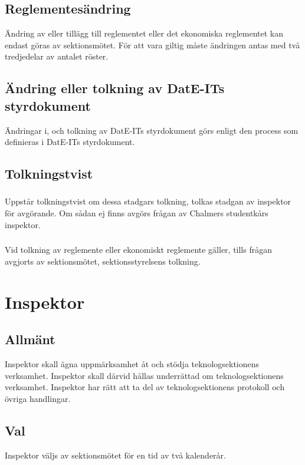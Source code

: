 \documentclass[a4paper]{dtek}
\begin{document}
\subsection{Reglementesändring}
Ändring av eller tillägg till reglementet eller det ekonomiska reglementet kan endast göras av sektionsmötet. För att vara giltig måste ändringen antas med två tredjedelar av antalet röster.
\subsection{Ändring eller tolkning av DatE-ITs styrdokument}
Ändringar i, och tolkning av DatE-ITs styrdokument görs enligt den process som definieras i DatE-ITs styrdokument.
\subsection{Tolkningstvist}
\subsubsection{}
Uppstår tolkningstvist om dessa stadgars tolkning, tolkas stadgan av inspektor för avgörande. Om sådan ej finns avgörs frågan av Chalmers studentkårs inspektor.
\subsubsection{}
Vid tolkning av reglemente eller ekonomiskt reglemente gäller, tills frågan avgjorts av sektionsmötet, sektionsstyrelsens tolkning.
\newpage

\section{Inspektor}
\subsection{Allmänt}
Inspektor skall ägna uppmärksamhet åt och stödja teknologsektionens verksamhet. Inspektor skall därvid hållas underrättad om teknologsektionens verksamhet. Inspektor har rätt att ta del av teknologsektionens protokoll och övriga handlingar.
\subsection{Val}
Inspektor väljs av sektionsmötet för en tid av två kalenderår.
\newpage

\end{document}
